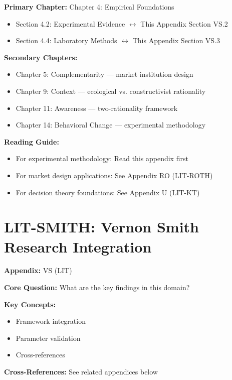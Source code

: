 \begin{tcolorbox}[colback=purple!5!white, colframe=purple!75!black,
    title=Chapter Linkage]

\textbf{Primary Chapter:} Chapter 4: Empirical Foundations
\begin{itemize}[nosep]
\item Section 4.2: Experimental Evidence $\leftrightarrow$ This Appendix Section VS.2
\item Section 4.4: Laboratory Methods $\leftrightarrow$ This Appendix Section VS.3
\end{itemize}

\textbf{Secondary Chapters:}
\begin{itemize}[nosep]
\item Chapter 5: Complementarity --- market institution design
\item Chapter 9: Context --- ecological vs. constructivist rationality
\item Chapter 11: Awareness --- two-rationality framework
\item Chapter 14: Behavioral Change --- experimental methodology
\end{itemize}

\textbf{Reading Guide:}
\begin{itemize}[nosep]
\item For experimental methodology: Read this appendix first
\item For market design applications: See Appendix RO (LIT-ROTH)
\item For decision theory foundations: See Appendix U (LIT-KT)
\end{itemize}

\end{tcolorbox}

\chapter{LIT-SMITH: Vernon Smith Research Integration}
\label{app:lit-smith}


\begin{tcolorbox}[colback=blue!5!white, colframe=blue!75!black,
    title=Quick Reference: Appendix VS]

\textbf{Appendix:} VS (LIT)

\textbf{Core Question:} What are the key findings in this domain?

\textbf{Key Concepts:}
\begin{itemize}[nosep]
\item Framework integration
\item Parameter validation
\item Cross-references
\end{itemize}

\textbf{Cross-References:} See related appendices below
\end{tcolorbox}

